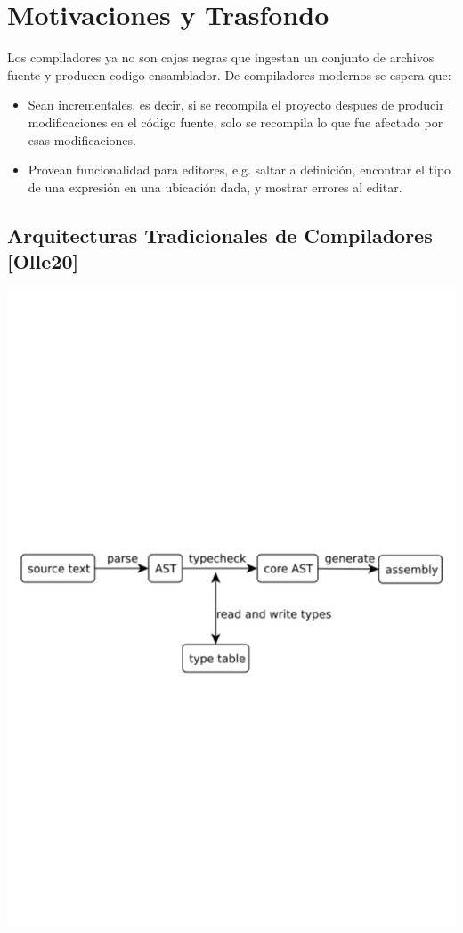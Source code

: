 \documentclass[12pt, a4paper]{report}
\begin{document}
\chapter*{Motivaciones y Trasfondo}

  Los compiladores ya no son cajas negras que ingestan un conjunto de archivos fuente y producen codigo ensamblador.
  De compiladores modernos se espera que:

  \begin{itemize}[noitemsep]

    \item Sean incrementales, es decir, si se recompila el proyecto despues de producir modificaciones en el código fuente, solo se recompila lo que fue afectado por esas modificaciones.

    \item Provean funcionalidad para editores, e.g. saltar a definición, encontrar el tipo de una expresión en una ubicación dada, y mostrar errores al editar.

  \end{itemize}

  \section*{Arquitecturas Tradicionales de Compiladores [Olle20]}

    \noindent
    \includegraphics[width=\textwidth]{olle_trad_comp_arq}
    \cite{olle_query_based}
\end{document}
